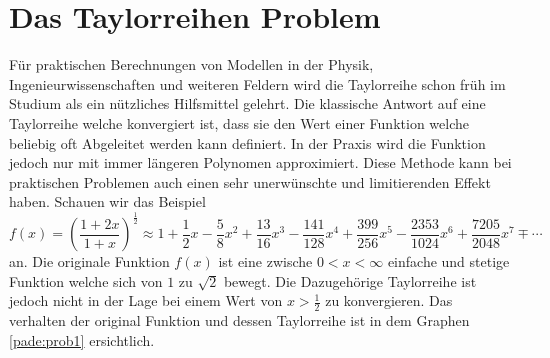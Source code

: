 \section{Das Taylorreihen Problem
\label{pade:Taylorfehler}}
Für praktischen Berechnungen von Modellen in der Physik, Ingenieurwissenschaften und weiteren Feldern wird die Taylorreihe schon früh im Studium als ein nützliches Hilfsmittel gelehrt.
Die klassische Antwort auf eine Taylorreihe welche konvergiert ist, dass sie den Wert einer Funktion welche beliebig oft Abgeleitet werden kann definiert. 
In der Praxis wird die Funktion jedoch nur mit immer längeren Polynomen approximiert.
Diese Methode kann bei praktischen Problemen auch einen sehr unerwünschte und limitierenden Effekt haben. 
Schauen wir das Beispiel 
\begin{equation*}
f(x)
=
(\frac{1+2x}{1+x})^{\frac{1}{2}}
\approx
1+\frac{1}{2}x - \frac{5}{8}x^2+\frac{13}{16}x^3 -\frac{141}{128}x^4 +\frac{399}{256}x^5 - \frac{2353}{1024}x^6 + \frac{7205}{2048}x^7 \mp \cdots
\end{equation*}
an. 
Die originale Funktion $f(x)$ ist eine zwische $0<x<\infty$ einfache und stetige Funktion welche sich von $1$ zu $\sqrt{2}$ bewegt.
Die Dazugehörige Taylorreihe ist jedoch nicht in der Lage bei einem Wert von $x>\frac{1}{2}$ zu konvergieren. 
Das verhalten der original Funktion und dessen Taylorreihe ist in dem Graphen \ref{pade:prob1} ersichtlich. 


